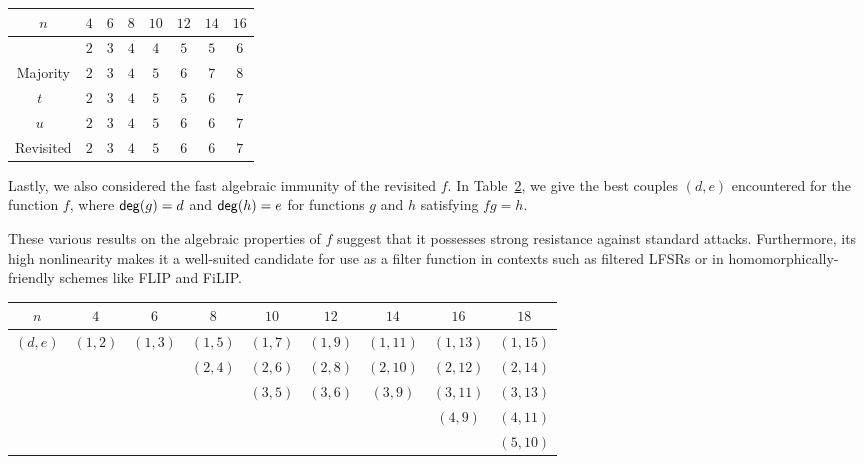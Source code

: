 \documentclass[11pt]{llncs}
\begin{document}
\begin{table}
	\centering
	\begin{tabular}{|c| c|c|c|c| c|c|c|}
		\hline
		$n$ & $4$  & $6$  & $8$  &  $10$ & $12$ & $14$ & $16$  \\
		\hline	
		\hwbf{}   & $2$  & $3$  & $4$  &  $4$ & $5$ & $5$ & $6$  \\  	
		Majority   & $2$  & $3$  & $4$  &  $5$ & $6$ & $7$ & $8$  \\
		$t$~\cite{DAM:MeaOza24}   & $2$  & $3$  & $4$  &  $5$ & $5$ & $6$ & $7$\\
		$u$~\cite{DAM:MeaOza24}   & $2$  & $3$  & $4$  &  $5$ & $6$ & $6$ & $7$ \\					
		Revisited \hwbf{}   & $2$  & $3$  & $4$  &  $5$ & $6$ & $6$ & $7$\\
		\hline
	\end{tabular}
	\label{table:comparisonsAI}
\end{table}

\bigskip
Lastly, we also considered the fast algebraic immunity of the revisited \hwbf{} $f$. In Table~\ref{table:FAI}, we give the best couples $(d,e)$ encountered for the function $f$, where $\mathsf{deg}(g)=d$ and $\mathsf{deg}(h)=e$ for functions $g$ and $h$ satisfying $fg=h$.

\bigskip
These various results on the algebraic properties of $f$ suggest that it possesses strong resistance against standard attacks. Furthermore, its high nonlinearity makes it a well-suited candidate for use as a filter function in contexts such as filtered \textsf{LFSR}s or in homomorphically-friendly schemes like \textsf{FLIP} and \textsf{FiLIP}.






\begin{table}
	\centering
	\begin{tabular}{|c|c|c|c|c|c|c|c|c|}
		\hline
		$ n $      & $4$     & $6$     & $8$     & $10$    & $12$    & $14$    & $16$    & $18$    \\ \hline
		$(d, e)$ & $(1,2)$ & $(1,3)$ & $(1,5)$  & $(1,7)$ & $(1,9)$ & $(1,11)$ & $(1,13)$ & $(1,15)$ \\ 
		 &     &    & $(2,4)$  & $(2,6)$ & $(2,8)$ & $(2,10)$ & $(2,12)$ & $(2,14)$\\ 
		 &     &    &     & $(3,5)$ & $(3,6)$ & $(3,9)$ & $(3,11)$ & $(3,13)$\\ 
		 &     &    &     &  &  &  & $(4,9)$ & $(4,11)$\\ 
	 &     &    &     &  &  &  &  & $(5,10)$ \\ \hline
	\end{tabular}
	\label{table:FAI}
\end{table}
\end{document}
